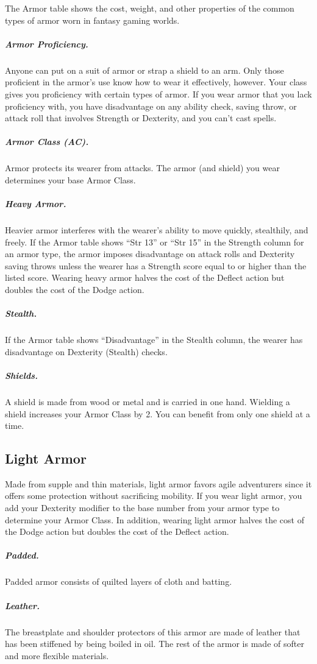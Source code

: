 The Armor table shows the cost, weight, and other properties of the common types of armor worn in fantasy gaming worlds.

\subparagraph*{Armor Proficiency.} Anyone can put on a suit of armor or strap a shield to an arm. Only those proficient in the armor's use know how to wear it effectively, however. Your class gives you proficiency with certain types of armor. If you wear armor that you lack proficiency with, you have disadvantage on any ability check, saving throw, or attack roll that involves Strength or Dexterity, and you can't cast spells.

\subparagraph*{Armor Class (AC).} Armor protects its wearer from attacks. The armor (and shield) you wear determines your base Armor Class.

\subparagraph*{Heavy Armor.} Heavier armor interferes with the wearer's ability to move quickly, stealthily, and freely. If the Armor table shows “Str 13” or “Str 15” in the Strength column for an armor type, the armor imposes disadvantage on attack rolls and Dexterity saving throws unless the wearer has a Strength score equal to or higher than the listed score. Wearing heavy armor halves the cost of the Deflect action but doubles the cost of the Dodge action.

\subparagraph*{Stealth.} If the Armor table shows “Disadvantage” in the Stealth column, the wearer has disadvantage on Dexterity (Stealth) checks.

\subparagraph*{Shields.} A shield is made from wood or metal and is carried in one hand. Wielding a shield increases your Armor Class by 2. You can benefit from only one shield at a time.

\subsection{Light Armor}

Made from supple and thin materials, light armor favors agile adventurers since it offers some protection without sacrificing mobility. If you wear light armor, you add your Dexterity modifier to the base number from your armor type to determine your Armor Class. In addition, wearing light armor halves the cost of the Dodge action but doubles the cost of the Deflect action.

\subparagraph*{Padded.} Padded armor consists of quilted layers of cloth and batting.

\subparagraph*{Leather.} The breastplate and shoulder protectors of this armor are made of leather that has been stiffened by being boiled in oil. The rest of the armor is made of softer and more flexible materials.

